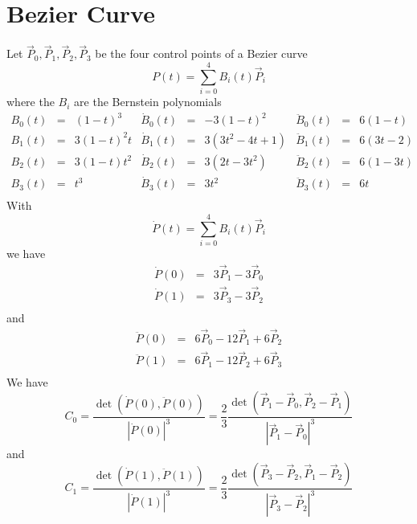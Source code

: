 \documentclass[11pt]{amsart}
\begin{document}
\section{Bezier Curve}
Let $\vec{P}_0,\vec{P}_1,\vec{P}_2,\vec{P}_3$
be the four control points of a Bezier curve
\[
	P(t) = \sum_{i=0}^4 B_i(t) \vec{P}_i
\]
where the $B_i$ are the Bernstein polynomials
\[
	\begin{array}{rcl|rcl|rcl}
	B_0(t) & = & (1-t)^3  & \dot{B}_0(t) & = & -3(1-t)^2     & \ddot{B}_0(t) & = & 6(1-t)\\
 	B_1(t) & = & 3(1-t)^2t & \dot{B}_1(t) & = &  3(3t^2-4t+1) & \ddot{B}_1(t) & = & 6(3t-2)\\
	B_2(t) & = & 3(1-t)t^2 & \dot{B}_2(t) & = &  3(2t-3t^2)   & \ddot{B}_2(t) & = & 6(1-3t)\\
	B_3(t) & = & t^3      & \dot{B}_3(t) & = &  3t^2         & \ddot{B}_3(t) & = & 6t    \\
	\end{array} 
\]
With
\[
	\dot{P}(t) = \sum_{i=0}^4 B_i(t) \vec{P}_i
\]
we have
\[
\begin{array}{rcl}
	\dot{P}(0) & = & 3\vec{P}_1 - 3\vec{P}_0 \\
	\dot{P}(1) & = & 3\vec{P}_3 - 3\vec{P}_2 \\
\end{array}
\]
and
\[
	\begin{array}{rcl}
	\ddot{P}(0) & = & 6\vec{P}_0 - 12 \vec{P}_1 + 6\vec{P}_2\\
	\ddot{P}(1) & = & 6\vec{P}_1 - 12 \vec{P}_2 + 6\vec{P}_3\\
	\end{array}
\]
We have
\[
	C_0 = \dfrac{\det(\dot{P}(0),\ddot{P}(0))}{\left|\dot{P}(0)\right|^3} 
	= \dfrac{2}{3} \dfrac{\det(\vec{P}_1 - \vec{P}_0,\vec{P}_2 - \vec{P}_1)}{\left|\vec{P}_1 - \vec{P}_0\right|^3}
\]
and
\[
	C_1 = \dfrac{\det(\dot{P}(1),\ddot{P}(1))}{\left|\dot{P}(1)\right|^3} 
	= \dfrac{2}{3} \dfrac{\det(\vec{P}_3 - \vec{P}_2,\vec{P}_1 - \vec{P}_2)}{\left|\vec{P}_3 - \vec{P}_2\right|^3}
\]
\end{document}

